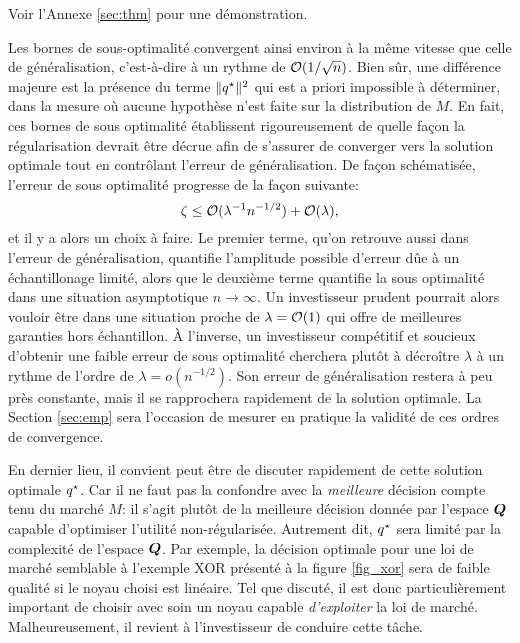 Voir l'Annexe \ref{sec:thm} pour une démonstration. 

Les bornes de sous-optimalité convergent ainsi environ à la même vitesse que celle de
généralisation, c'est-à-dire à un rythme de $\mathcal O(1/\sqrt{n})$. Bien sûr, une différence
majeure est la présence du terme $\|q^\star\|^2$ qui est a priori impossible à déterminer,
dans la mesure où aucune hypothèse n'est faite sur la distribution de $M$.  En fait, ces
bornes de sous optimalité établissent rigoureusement de quelle façon la régularisation
devrait être décrue afin de s'assurer de converger vers la solution optimale tout en
contrôlant l'erreur de généralisation. De façon schématisée, l'erreur de sous optimalité
progresse de la façon suivante:
\begin{equation}
  \zeta \leq \mathcal O(\lambda^{-1}n^{-1/2}) + \mathcal O(\lambda),
\end{equation}
et il y a alors un choix à faire. Le premier terme, qu'on retrouve aussi dans l'erreur de
généralisation, quantifie l'amplitude possible d'erreur dûe à un échantillonage limité,
alors que le deuxième terme quantifie la sous optimalité dans une situation asymptotique
$n \to \infty$. Un investisseur prudent pourrait alors vouloir être dans une situation proche de
$\lambda = \mathcal O(1)$ qui offre de meilleures garanties hors échantillon. À l'inverse, un
investisseur compétitif et soucieux d'obtenir une faible erreur de sous optimalité
cherchera plutôt à décroître $\lambda$ à un rythme de l'ordre de $\lambda = o(n^{-1/2})$. Son erreur
de généralisation restera à peu près constante, mais il se rapprochera rapidement de la
solution optimale. La Section \ref{sec:emp} sera l'occasion de mesurer en pratique la
validité de ces ordres de convergence.

En dernier lieu, il convient peut être de discuter rapidement de cette solution optimale
$q^\star$. Car il ne faut pas la confondre avec la \textit{meilleure} décision compte tenu du
marché $M$: il s'agit plutôt de la meilleure décision donnée par l'espace $\bm Q$ capable
d'optimiser l'utilité non-régularisée. Autrement dit, $q^\star$ sera limité par la complexité
de l'espace $\bm Q$. Par exemple, la décision optimale pour une loi de marché semblable à
l'exemple XOR présenté à la figure \ref{fig_xor} sera de faible qualité si le noyau choisi
est linéaire. Tel que discuté, il est donc particulièrement important de choisir avec soin
un noyau capable \textit{d'exploiter} la loi de marché. Malheureusement, il revient à
l'investisseur de conduire cette tâche.





